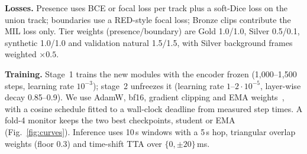 \documentclass[conference]{IEEEtran}
\begin{document}
\textbf{Losses.} Presence uses BCE or focal loss per track plus a soft-Dice loss on the union track; boundaries
use a RED-style focal loss; Bronze clips contribute the MIL loss only. Tier weights (presence/boundary) are Gold
1.0/1.0, Silver 0.5/0.1, synthetic 1.0/1.0 and validation natural 1.5/1.5, with Silver background frames weighted
$\times0.5$.

\textbf{Training.} Stage~1 trains the new modules with the encoder frozen (1,000--1,500 steps, learning rate
$10^{-3}$); stage~2 unfreezes it (learning rate $1$--$2{\cdot}10^{-5}$, layer-wise decay 0.85--0.9). We use AdamW,
bf16, gradient clipping and EMA weights~\cite{meanteacher}, with a cosine schedule fitted to a wall-clock deadline
from measured step times. A fold-4 monitor keeps the two best checkpoints, student or EMA (Fig.~\ref{fig:curves}).
Inference uses 10\,s windows with a 5\,s hop, triangular overlap weights (floor 0.3) and time-shift TTA over
$\{0,\pm20\}$\,ms.
\end{document}
